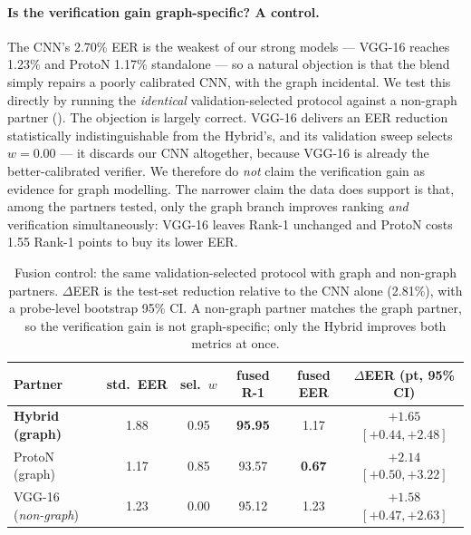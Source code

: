 \documentclass[11pt]{article}
\begin{document}
\paragraph{Is the verification gain graph-specific? A control.} The CNN's 2.70\% EER is the weakest of our strong models --- VGG-16 reaches 1.23\% and ProtoN 1.17\% standalone --- so a natural objection is that the blend simply repairs a poorly calibrated CNN, with the graph incidental. We test this directly by running the \emph{identical} validation-selected protocol against a non-graph partner (). The objection is largely correct. VGG-16 delivers an EER reduction statistically indistinguishable from the Hybrid's, and its validation sweep selects $w{=}0.00$ --- it discards our CNN altogether, because VGG-16 is already the better-calibrated verifier. We therefore do \emph{not} claim the verification gain as evidence for graph modelling. The narrower claim the data does support is that, among the partners tested, only the graph branch improves ranking \emph{and} verification simultaneously: VGG-16 leaves Rank-1 unchanged and ProtoN costs 1.55 Rank-1 points to buy its lower EER.

\begin{table}[t]
  \centering
  \caption{Fusion control: the same validation-selected protocol with graph and non-graph partners. $\Delta$EER is the test-set reduction relative to the CNN alone (2.81\%), with a probe-level bootstrap 95\% CI. A non-graph partner matches the graph partner, so the verification gain is not graph-specific; only the Hybrid improves both metrics at once.}
  \label{tab:fusioncontrol}
  \small
  \setlength{\tabcolsep}{4pt}
  \begin{tabular}{lccccc}
    \toprule
    Partner & std.\ EER & sel.\ $w$ & fused R-1 & fused EER & $\Delta$EER (pt, 95\% CI) \\
    \midrule
    \textbf{Hybrid (graph)} & 1.88 & 0.95 & \textbf{95.95} & 1.17 & $+1.65$ $[+0.44,+2.48]$ \\
    ProtoN (graph) & 1.17 & 0.85 & 93.57 & \textbf{0.67} & $+2.14$ $[+0.50,+3.22]$ \\
    VGG-16 (\emph{non-graph}) & 1.23 & 0.00 & 95.12 & 1.23 & $+1.58$ $[+0.47,+2.63]$ \\
    \bottomrule
  \end{tabular}
\end{table}
\end{document}
